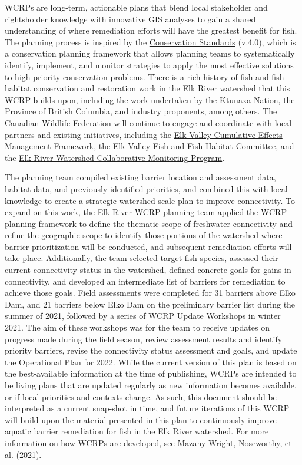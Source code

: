 \documentclass[
  letterpaper,
  DIV=11,
  numbers=noendperiod]{scrreprt}
\begin{document}
WCRPs are long-term, actionable plans that blend local stakeholder and
rightsholder knowledge with innovative GIS analyses to gain a shared
understanding of where remediation efforts will have the greatest
benefit for fish. The planning process is inspired by the
\href{https://cmp-openstandards.org/wp-content/uploads/2020/07/CMP-Open-Standards-for-the-Practice-of-Conservation-v4.0.pdf}{Conservation
Standards} (v.4.0), which is a conservation planning framework that
allows planning teams to systematically identify, implement, and monitor
strategies to apply the most effective solutions to high-priority
conservation problems. There is a rich history of fish and fish habitat
conservation and restoration work in the Elk River watershed that this
WCRP builds upon, including the work undertaken by the Ktunaxa Nation,
the Province of British Columbia, and industry proponents, among others.
The Canadian Wildlife Federation will continue to engage and coordinate
with local partners and existing initiatives, including the
\href{https://www2.gov.bc.ca/gov/content/environment/natural-resource-stewardship/cumulative-effects-framework/regional-assessments/kootenay-boundary/elk-valley-cemf}{Elk
Valley Cumulative Effects Management Framework}, the Elk Valley Fish and
Fish Habitat Committee, and the
\href{https://elkrivercollaborative.ca/}{Elk River Watershed
Collaborative Monitoring Program}.

The planning team compiled existing barrier location and assessment
data, habitat data, and previously identified priorities, and combined
this with local knowledge to create a strategic watershed-scale plan to
improve connectivity. To expand on this work, the Elk River WCRP
planning team applied the WCRP planning framework to define the thematic
scope of freshwater connectivity and refine the geographic scope to
identify those portions of the watershed where barrier prioritization
will be conducted, and subsequent remediation efforts will take place.
Additionally, the team selected target fish species, assessed their
current connectivity status in the watershed, defined concrete goals for
gains in connectivity, and developed an intermediate list of barriers
for remediation to achieve those goals. Field assessments were completed
for 31 barriers above Elko Dam, and 21 barriers below Elko Dam on the
preliminary barrier list during the summer of 2021, followed by a series
of WCRP Update Workshops in winter 2021. The aim of these workshops was
for the team to receive updates on progress made during the field
season, review assessment results and identify priority barriers, revise
the connectivity status assessment and goals, and update the Operational
Plan for 2022. While the current version of this plan is based on the
best-available information at the time of publishing, WCRPs are intended
to be living plans that are updated regularly as new information becomes
available, or if local priorities and contexts change. As such, this
document should be interpreted as a current snap-shot in time, and
future iterations of this WCRP will build upon the material presented in
this plan to continuously improve aquatic barrier remediation for fish
in the Elk River watershed. For more information on how WCRPs are
developed, see Mazany-Wright, Noseworthy, et al. (2021).
\end{document}
